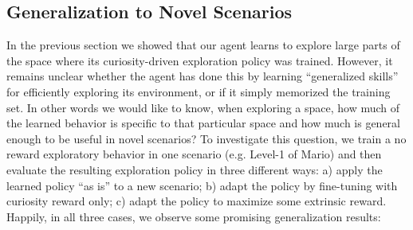 \documentclass{article}
\begin{document}
\subsection{Generalization to Novel Scenarios}
\label{sec:generalization}
In the previous section we showed that our agent learns to explore large parts of the space where its curiosity-driven exploration policy was trained. However, it remains unclear whether the agent has done this by learning ``generalized skills'' for efficiently exploring its environment, or if it simply memorized the training set.
In other words we would like to know, when exploring a space, how much of the learned behavior is specific to that particular space and how much is general enough to be useful in novel scenarios? To investigate this question, we train a no reward exploratory behavior in one scenario (e.g. Level-1 of Mario) and then evaluate the resulting exploration policy in three different ways: a) apply the learned policy ``as is'' to a new scenario; b) adapt the policy by fine-tuning with curiosity reward only; c) adapt the policy to maximize some extrinsic reward. Happily, in all three cases, we observe some promising generalization results:
\end{document}
